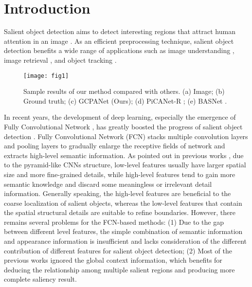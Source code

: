 \documentclass[letterpaper]{article} \usepackage{aaai20}  \usepackage{times}  \usepackage{helvet} \usepackage{courier}  \usepackage[hyphens]{url}  \usepackage{graphicx} \urlstyle{rm} \def\UrlFont{\rm}  \usepackage{graphicx}  \frenchspacing  \setlength{\pdfpagewidth}{8.5in}  \setlength{\pdfpageheight}{11in}
\begin{document}
\section{Introduction} 
Salient object detection aims to detect interesting regions that attract human attention in an image \cite{cong2018review}.
As an efficient preprocessing technique, salient object detection benefits a wide range of applications
such as image understanding \cite{zhang2014saliency}, image retrieval \cite{gao2015database}, 
and object tracking \cite{hong2015online}. \\
\begin{figure}[ht]
	\centering 
	\texttt{[image: fig1]}
	\caption {Sample results of our method compared with others. 
		(a) Image; (b) Ground truth; (c) GCPANet (Ours); (d) PiCANet-R \cite{liu2018picanet}; (e) BASNet \cite{qin2019basnet}.
	}
	\label{fig1}
\end{figure} 
\indent In recent years, the development of deep learning, 
especially the emergence of Fully Convolutional Network \cite{long2015fully}, 
has greatly boosted the progress of salient object detection \cite{zhao2015saliency,li2016deep,wang2016saliency}.
Fully Convolutional Network (FCN) stacks multiple convolution layers and pooling layers to gradually enlarge the receptive fields of network
and extracts high-level semantic information.
As pointed out in previous works \cite{luo2017non,zhang2017amulet}, due to the pyramid-like CNNs structure, 
low-level features usually have larger spatial size and more fine-grained details, while high-level features tend to gain more semantic knowledge and discard some meaningless or irrelevant detail information. 
Generally speaking, the high-level features are beneficial to the coarse localization of salient objects,
whereas the low-level features that contain the spatial structural details are suitable to refine boundaries.
However, there remains several problems for the FCN-based methods: 
(1) Due to the gap between different level features, the simple combination of semantic information and appearance information
is insufficient and lacks consideration of the different contribution of different features for salient object detection;
(2) Most of the previous works ignored the global context information, which benefits for deducing the relationship among multiple salient regions and producing more complete saliency result. \\
\end{document}
